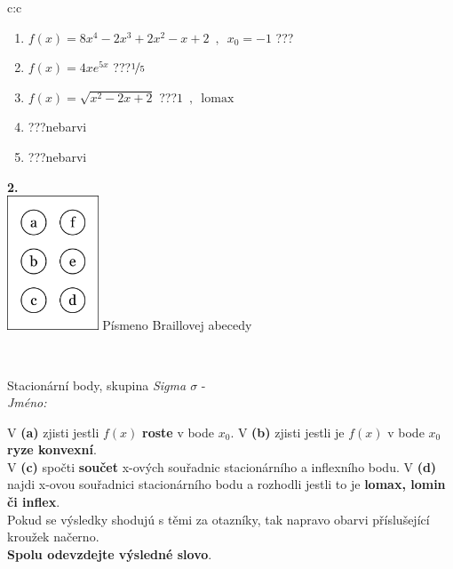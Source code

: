 \documentclass[10pt]{report}
\begin{document}
\begin{tabular}{c:c}
\begin{minipage}[c][104.5mm][t]{0.5\linewidth}
\begin{center}
\begin{minipage}{0.79\linewidth}
\begin{center}
\begin{varwidth}{\linewidth}
\begin{enumerate}
\item $f(x)=8x^4-2x^3+2x^2-x+2\enspace , \enspace x_0=-1$\quad \dotfill\; ???\;\dotfill \quad {}
\item $f(x)=4xe^{5x}$\quad \dotfill\; ???\;\dotfill \quad $\nicefrac{1}{5}$
\item $f(x)=\sqrt{x^2-2x+2}$\quad \dotfill\; ???\;\dotfill \quad $1\enspace , \enspace\mathrm{lomax}$
\item \quad \dotfill\; ???\;\dotfill \quad nebarvi
\item \quad \dotfill\; ???\;\dotfill \quad nebarvi
\end{enumerate}
\end{varwidth}
\end{center}
\end{minipage}
\begin{minipage}{0.20\linewidth}
\begin{center}
{\Huge\bfseries 2.} \\[2mm]
\includegraphics[height=40mm]{../images/braille.png}
{\small Písmeno Braillovej abecedy}
\end{center}
\end{minipage}
\end{center}
\end{minipage}
\\ \hdashline
\begin{minipage}[c][104.5mm][t]{0.5\linewidth}
\begin{center}
\vspace{7mm}
{\huge Stacionární body, skupina \textit{Sigma $\sigma$} -}\\[5mm]
\textit{Jméno:}\phantom{xxxxxxxxxxxxxxxxxxxxxxxxxxxxxxxxxxxxxxxxxxxxxxxxxxxxxxxxxxxxxxxxx}\\[5mm]
\begin{minipage}{0.95\linewidth}
\begin{center}
{\small V \textbf{(a)} zjisti jestli $f(x)$ \textbf{roste} v bode $x_0$. V \textbf{(b)} zjisti jestli je $f(x)$ v bode $x_0$ \textbf{ryze konvexní}.\\V \textbf{(c)} spočti \textbf{součet} x-ových souřadnic stacionárního a inflexního bodu. V \textbf{(d)} najdi x-ovou souřadnici stacionárního bodu a rozhodli jestli to je \textbf{lomax, lomin či inflex}.\\Pokud se výsledky shodujú s těmi za otazníky, tak napravo obarvi příslušející kroužek načerno.\\\textbf{Spolu odevzdejte výsledné slovo}}.

\end{center}
\end{minipage}
\end{center}
\end{minipage}
\end{tabular}
\end{document}
